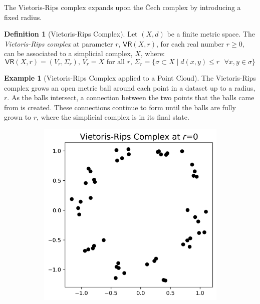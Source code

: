 \documentclass[ma]{uncgdissertationexp}
\theoremstyle{plain}
\theoremstyle{definition}
\newtheorem{definition}[theorem]{Definition}
\newtheorem{example}[theorem]{Example}
\theoremstyle{remark}
\begin{document}
\par The Vietoris-Rips complex expands upon the Čech complex by introducing a fixed radius.

\begin{definition}[Vietoris-Rips Complex]
Let $(X, d)$ be a finite metric space. The \textit{Vietoris-Rips complex} at parameter $r$, $\mathsf{VR}(X, r)$, for each real number $r\geq0$, can be associated to a simplicial complex, $X$, where:
$$\mathsf{VR}(X, r) = (V_{r}, \Sigma_{r})\text{, }V_{r}=X\text{ for all }r\text{, }\Sigma_{r} = \{\sigma \subset X \mid d(x,y) \leq r\text{ }\forall x, y \in \sigma\}$$
\end{definition}

\newpage 
\begin{example}[Vietoris-Rips Complex applied to a Point Cloud]
\par The Vietoris-Rips complex grows an open metric ball around each point in a dataset up to a radius, $r$. As the balls intersect, a connection between the two points that the balls came from is created. These connections continue to form until the balls are fully grown to $r$, where the simplicial complex is in its final state.
\begin{figure}[H]
    \centering
    \begin{subfigure}[b]{0.22\textwidth}
        \centering
        \includegraphics[width=\textwidth]{point_cloud_plot_r0.png}

\end{subfigure}
\end{figure}
\end{example}
\end{document}
